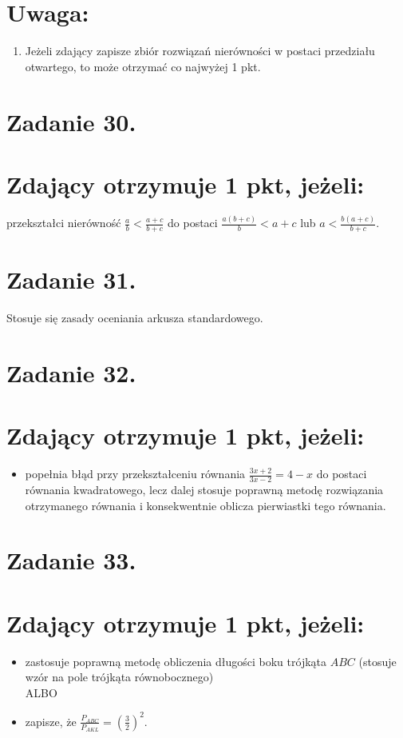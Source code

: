\documentclass[10pt]{article}
\begin{document}
\section*{Uwaga:}
\begin{enumerate}
  \item Jeżeli zdający zapisze zbiór rozwiązań nierówności w postaci przedziału otwartego, to może otrzymać co najwyżej 1 pkt.
\end{enumerate}

\section*{Zadanie 30.}
\section*{Zdający otrzymuje 1 pkt, jeżeli:}
przekształci nierówność $\frac{a}{b}<\frac{a+c}{b+c}$ do postaci $\frac{a(b+c)}{b}<a+c$ lub $a<\frac{b(a+c)}{b+c}$.

\section*{Zadanie 31.}
Stosuje się zasady oceniania arkusza standardowego.

\section*{Zadanie 32.}
\section*{Zdający otrzymuje 1 pkt, jeżeli:}
\begin{itemize}
  \item popełnia błąd przy przekształceniu równania $\frac{3 x+2}{3 x-2}=4-x$ do postaci równania kwadratowego, lecz dalej stosuje poprawną metodę rozwiązania otrzymanego równania i konsekwentnie oblicza pierwiastki tego równania.
\end{itemize}

\section*{Zadanie 33.}
\section*{Zdający otrzymuje 1 pkt, jeżeli:}
\begin{itemize}
  \item zastosuje poprawną metodę obliczenia długości boku trójkąta $A B C$ (stosuje wzór na pole trójkąta równobocznego)\\
ALBO
  \item zapisze, że $\frac{P_{A B C}}{P_{A K L}}=\left(\frac{3}{2}\right)^{2}$.
\end{itemize}
\end{document}
